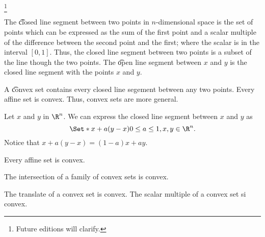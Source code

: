 
\footnote{Future editions will clarify.}


The \t{closed line segment between} two points in $n$-dimensional space is the set of points which can be expressed as the sum of the first point and a scalar multiple of the difference between the second point and the first; where the scalar is in the interval $[0, 1]$.
Thus, the closed line segment between two points is a subset of the line though the two points.
The \t{open line segment} between $x$ and $y$ is the closed line segment with the points $x$ and $y$.

A \t{convex set} contains every closed line segement between any two points.
Every affine set is convex.
Thus, convex sets are more general.


Let $x$ and $y$ in $\R^n$. We can express the closed line segment between $x$ and $y$ as
$$
  \Set*{x + a(y - x)}{0 \leq a \leq 1, x, y \in \R^n}.
$$
Notice that $x + a(y - x) = (1-a)x + ay$.


\begin{prop}
  Every affine set is convex.
\end{prop}

\begin{prop}
  The intersection of a family of convex sets is convex.
\end{prop}

\begin{prop}
  The translate of a convex set is convex.
  The scalar multiple of a convex set si convex.
\end{prop}

